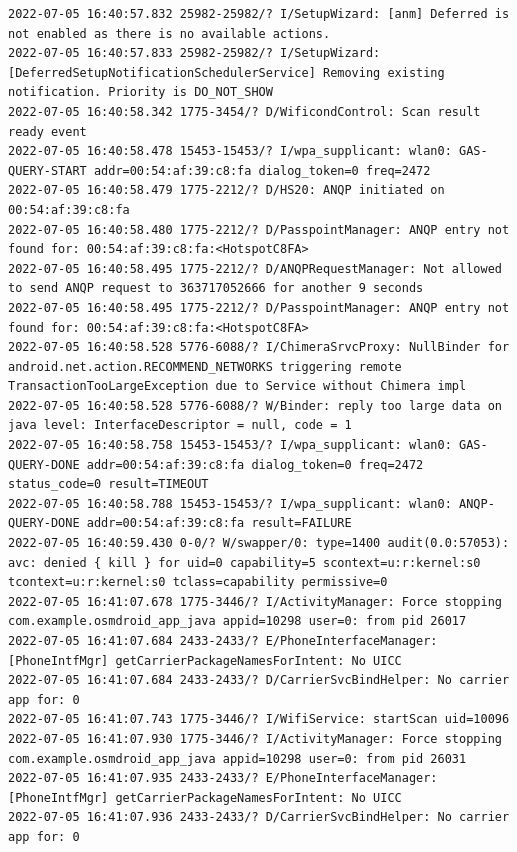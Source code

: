 \documentclass[a4paper,12pt]{book}
\begin{document}
\begin{lstlisting}
2022-07-05 16:40:57.832 25982-25982/? I/SetupWizard: [anm] Deferred is not enabled as there is no available actions.
2022-07-05 16:40:57.833 25982-25982/? I/SetupWizard: [DeferredSetupNotificationSchedulerService] Removing existing notification. Priority is DO_NOT_SHOW
2022-07-05 16:40:58.342 1775-3454/? D/WificondControl: Scan result ready event
2022-07-05 16:40:58.478 15453-15453/? I/wpa_supplicant: wlan0: GAS-QUERY-START addr=00:54:af:39:c8:fa dialog_token=0 freq=2472
2022-07-05 16:40:58.479 1775-2212/? D/HS20: ANQP initiated on 00:54:af:39:c8:fa
2022-07-05 16:40:58.480 1775-2212/? D/PasspointManager: ANQP entry not found for: 00:54:af:39:c8:fa:<HotspotC8FA>
2022-07-05 16:40:58.495 1775-2212/? D/ANQPRequestManager: Not allowed to send ANQP request to 363717052666 for another 9 seconds
2022-07-05 16:40:58.495 1775-2212/? D/PasspointManager: ANQP entry not found for: 00:54:af:39:c8:fa:<HotspotC8FA>
2022-07-05 16:40:58.528 5776-6088/? I/ChimeraSrvcProxy: NullBinder for android.net.action.RECOMMEND_NETWORKS triggering remote TransactionTooLargeException due to Service without Chimera impl
2022-07-05 16:40:58.528 5776-6088/? W/Binder: reply too large data on java level: InterfaceDescriptor = null, code = 1
2022-07-05 16:40:58.758 15453-15453/? I/wpa_supplicant: wlan0: GAS-QUERY-DONE addr=00:54:af:39:c8:fa dialog_token=0 freq=2472 status_code=0 result=TIMEOUT
2022-07-05 16:40:58.788 15453-15453/? I/wpa_supplicant: wlan0: ANQP-QUERY-DONE addr=00:54:af:39:c8:fa result=FAILURE
2022-07-05 16:40:59.430 0-0/? W/swapper/0: type=1400 audit(0.0:57053): avc: denied { kill } for uid=0 capability=5 scontext=u:r:kernel:s0 tcontext=u:r:kernel:s0 tclass=capability permissive=0
2022-07-05 16:41:07.678 1775-3446/? I/ActivityManager: Force stopping com.example.osmdroid_app_java appid=10298 user=0: from pid 26017
2022-07-05 16:41:07.684 2433-2433/? E/PhoneInterfaceManager: [PhoneIntfMgr] getCarrierPackageNamesForIntent: No UICC
2022-07-05 16:41:07.684 2433-2433/? D/CarrierSvcBindHelper: No carrier app for: 0
2022-07-05 16:41:07.743 1775-3446/? I/WifiService: startScan uid=10096
2022-07-05 16:41:07.930 1775-3446/? I/ActivityManager: Force stopping com.example.osmdroid_app_java appid=10298 user=0: from pid 26031
2022-07-05 16:41:07.935 2433-2433/? E/PhoneInterfaceManager: [PhoneIntfMgr] getCarrierPackageNamesForIntent: No UICC
2022-07-05 16:41:07.936 2433-2433/? D/CarrierSvcBindHelper: No carrier app for: 0

\end{lstlisting}
\end{document}
